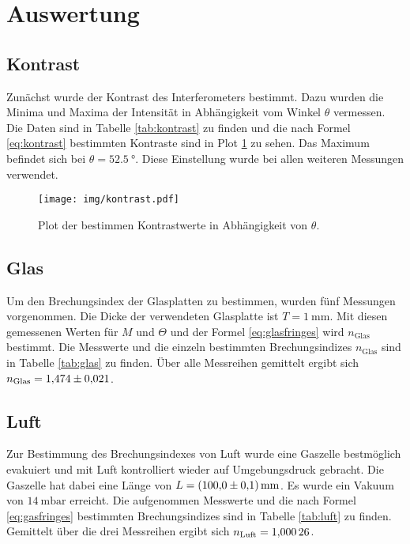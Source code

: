 \section{Auswertung}
\label{sec:Auswertung}


\subsection{Kontrast}

Zunächst wurde der Kontrast des Interferometers bestimmt. Dazu wurden die Minima und Maxima der Intensität in Abhängigkeit vom Winkel $\theta$ vermessen. Die Daten sind in Tabelle \ref{tab:kontrast} zu finden und die nach Formel \eqref{eq:kontrast} bestimmten Kontraste sind in Plot \ref{img:kontrast} zu sehen. Das  Maximum befindet sich bei $\theta = \SI{52.5}{°}$. Diese Einstellung wurde bei allen weiteren Messungen verwendet.

\begin{figure}
  \centering
  \texttt{[image: img/kontrast.pdf]}
  \caption{Plot der bestimmen Kontrastwerte in Abhängigkeit von $\theta$.}
  \label{img:kontrast}
\end{figure}




\subsection{Glas}

Um den Brechungsindex der Glasplatten zu bestimmen, wurden fünf Messungen vorgenommen. Die Dicke der verwendeten Glasplatte ist $T=\SI{1}{\milli\meter}$.
Mit diesen gemessenen Werten für $M$ und $\Theta$ und der Formel \eqref{eq:glasfringes} wird $n_\text{Glas}$ bestimmt. Die Messwerte und die einzeln bestimmten Brechungsindizes
 $n_\text{Glas}$ sind in Tabelle \ref{tab:glas} zu finden.
Über alle Messreihen gemittelt ergibt sich $n_\text{Glas}=\num{1,474\pm 0,021}$.




\subsection{Luft}

Zur Bestimmung des Brechungsindexes von Luft wurde eine Gaszelle bestmöglich evakuiert und mit Luft kontrolliert wieder auf Umgebungsdruck gebracht. Die Gaszelle hat dabei eine Länge von $L=\SI{100\pm 0.1}{\milli \meter}$. Es wurde ein
Vakuum von $\SI{14}{\milli \bar}$ erreicht. Die aufgenommen Messwerte und die nach Formel \eqref{eq:gasfringes} bestimmten Brechungsindizes sind in Tabelle \ref{tab:luft} zu finden.
Gemittelt über die drei Messreihen ergibt sich $n_\text{Luft}=\num{1.00026 \pm 0.00000}$.

